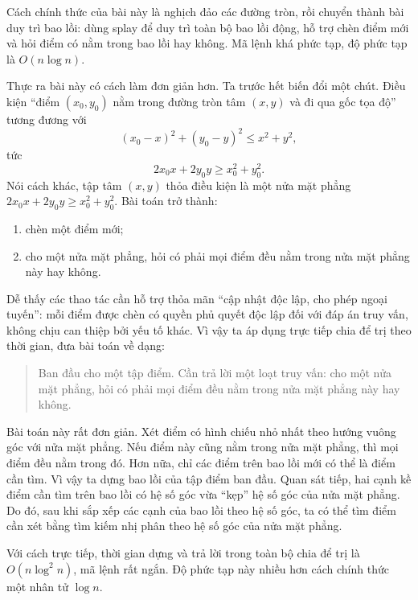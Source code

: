 \documentclass[11pt]{article}
\begin{document}
Cách chính thức của bài này là nghịch đảo các đường tròn, rồi chuyển thành
bài duy trì bao lồi: dùng splay để duy trì toàn bộ bao lồi động, hỗ trợ chèn
điểm mới và hỏi điểm có nằm trong bao lồi hay không. Mã lệnh khá phức tạp,
độ phức tạp là \(O(n\log n)\).

Thực ra bài này có cách làm đơn giản hơn. Ta trước hết biến đổi một chút.
Điều kiện ``điểm \((x_0,y_0)\) nằm trong đường tròn tâm \((x,y)\) và đi qua
gốc tọa độ'' tương đương với
\[
  (x_0-x)^2+(y_0-y)^2\le x^2+y^2,
\]
tức
\[
  2x_0x+2y_0y\ge x_0^2+y_0^2.
\]
Nói cách khác, tập tâm \((x,y)\) thỏa điều kiện là một nửa mặt phẳng
\(2x_0x+2y_0y\ge x_0^2+y_0^2\). Bài toán trở thành:
\begin{enumerate}
  \item chèn một điểm mới;
  \item cho một nửa mặt phẳng, hỏi có phải mọi điểm đều nằm trong nửa mặt
  phẳng này hay không.
\end{enumerate}

Dễ thấy các thao tác cần hỗ trợ thỏa mãn ``cập nhật độc lập, cho phép ngoại
tuyến'': mỗi điểm được chèn có quyền phủ quyết độc lập đối với đáp án truy
vấn, không chịu can thiệp bởi yếu tố khác. Vì vậy ta áp dụng trực tiếp chia
để trị theo thời gian, đưa bài toán về dạng:
\begin{quote}
Ban đầu cho một tập điểm. Cần trả lời một loạt truy vấn: cho một nửa mặt
phẳng, hỏi có phải mọi điểm đều nằm trong nửa mặt phẳng này hay không.
\end{quote}

Bài toán này rất đơn giản. Xét điểm có hình chiếu nhỏ nhất theo hướng vuông
góc với nửa mặt phẳng. Nếu điểm này cũng nằm trong nửa mặt phẳng, thì mọi
điểm đều nằm trong đó. Hơn nữa, chỉ các điểm trên bao lồi mới có thể là điểm
cần tìm. Vì vậy ta dựng bao lồi của tập điểm ban đầu. Quan sát tiếp, hai
cạnh kề điểm cần tìm trên bao lồi có hệ số góc vừa ``kẹp'' hệ số góc của
nửa mặt phẳng. Do đó, sau khi sắp xếp các cạnh của bao lồi theo hệ số góc,
ta có thể tìm điểm cần xét bằng tìm kiếm nhị phân theo hệ số góc của nửa mặt
phẳng.

Với cách trực tiếp, thời gian dựng và trả lời trong toàn bộ chia để trị là
\(O(n\log^2 n)\), mã lệnh rất ngắn. Độ phức tạp này nhiều hơn cách chính
thức một nhân tử \(\log n\).
\end{document}
